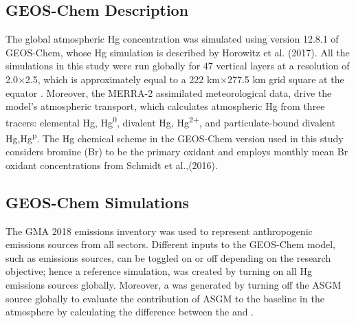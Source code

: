 \subsection{GEOS-Chem Description}
\begin{flushleft}


The global atmospheric Hg concentration was simulated using version 12.8.1 of GEOS-Chem, whose Hg simulation is described by Horowitz et al. (2017)\cite{horowitz_new_2017}. All the simulations in this study were run globally for 47 vertical layers at a resolution of 2.0$\times$2.5, which is approximately equal to a 222 km$\times$277.5 km grid square at the equator \cite{horowitz_new_2017}. Moreover, the MERRA-2 assimilated meteorological data,\cite{gelaro_modern-era_2017} drive the model's atmospheric transport, which calculates atmospheric Hg from three tracers: elemental Hg, Hg\textsuperscript{0}, divalent Hg, Hg\textsuperscript{2+}, and particulate-bound divalent Hg,Hg\textsuperscript{p}. The Hg chemical scheme in the GEOS-Chem version used in this study considers bromine (Br) to be the primary \hg oxidant\cite{horowitz_new_2017} and employs monthly mean Br oxidant concentrations from Schmidt et al.,(2016)\cite{schmidt_modeling_2016}. 
\end{flushleft}
\begin{flushleft}
\subsection{GEOS-Chem Simulations}
The GMA 2018 emissions inventory was used to represent anthropogenic emissions sources from all sectors\cite{steenhuisen_development_2019}. Different inputs to the GEOS-Chem model, such as emissions sources, can be toggled on or off depending on the research objective; hence a reference simulation, \on was created by turning on all Hg emissions sources globally. Moreover, a \off was generated by turning off the ASGM source globally to evaluate the contribution of ASGM to the baseline \hg in the atmosphere by calculating the difference between the \on and \off.
\end{flushleft}


